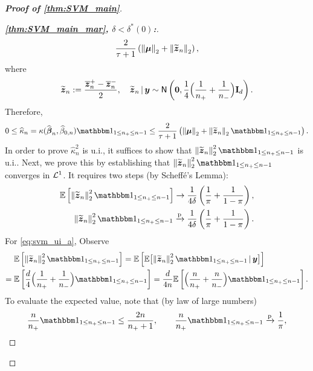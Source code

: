 \begin{proof}[\textbf{Proof of \cref{thm:SVM_main}}]
\begin{proof}[\textbf{\emph{\ref{thm:SVM_main_mar}, $\delta < \delta^*(0)$:}}]
\begin{equation*}
        \frac{2}{\tau + 1} \left( \left\|{{\boldsymbol{\mu}}}\right\|_2 + \left\|{ \widetilde {\text{\boldmath $z$}}_n }\right\|_2 \right),
\end{equation*}
where
\begin{equation*}
    \widetilde {\text{\boldmath $z$}}_n := \frac{\overline{\text{\boldmath $z$}}^+_n - \overline{\text{\boldmath $z$}}^-_n}{2},
    \quad
    \widetilde {\text{\boldmath $z$}}_n \,|\, \text{\boldmath $y$} \sim {\sf N}\left( \mathrm{\bf 0}, \frac14\Bigl( \frac{1}{n_+} + \frac{1}{n_-} \Bigr) \mathrm{\bf I}_d \right).
\end{equation*}
Therefore,
\begin{equation*}
    0   \le   \hat\kappa_n  =  \kappa(\hat\vbeta_n, \hat\beta_{0,n}) \ind_{1 \le n_+ \le n-1} 
    \le \frac{2}{\tau + 1} \left( 
        \norm{\vmu}_2 + \norm{ \wt \zz_n }_2 \ind_{1 \le n_+ \le n-1}
     \right).
\end{equation*}
In order to prove $\hat\kappa_n^2$ is u.i., it suffices to show that $\norm{ \wt \zz_n }_2^2 \ind_{1 \le n_+ \le n-1}$ is u.i.. Next, we prove this by establishing that $\norm{ \wt \zz_n }_2^2 \ind_{1 \le n_+ \le n-1}$ converges in $\mathcal{L}^1$. It requires two steps (by Scheffé's Lemma):
\begin{subequations}
\begin{align}
    \E \left[ \norm{ \wt \zz_n }_2^2 \ind_{1 \le n_+ \le n-1} \right] \to \frac{1}{4\delta} \left( \frac{1}{\pi} + \frac{1}{1-\pi} \right),
    \label{eq:svm_ui_a}
    \\
    \norm{ \wt \zz_n }_2^2 \ind_{1 \le n_+ \le n-1} \conp \frac{1}{4\delta} \left( \frac{1}{\pi} + \frac{1}{1-\pi} \right).
    \label{eq:svm_ui_b}
\end{align}
\end{subequations}
For \cref{eq:svm_ui_a}, Observe
\begin{equation*}
    \begin{aligned}
      & \E \left[ \norm{ \wt \zz_n }_2^2 \ind_{1 \le n_+ \le n-1} \right]
    = \E \left[ \E\bigl[ \norm{ \wt \zz_n }_2^2 \ind_{1 \le n_+ \le n-1} \,|\, \yy \bigr] \right] \\
    = {} & \E \left[ \frac{d}{4} \Bigl( \frac{1}{n_+} + \frac{1}{n_-} \Bigr) \ind_{1 \le n_+ \le n-1} \right]
    = \frac{d}{4n} \E \left[ \Bigl( \frac{n}{n_+} + \frac{n}{n_-} \Bigr) \ind_{1 \le n_+ \le n-1} \right].
    \end{aligned}
\end{equation*}
To evaluate the expected value, note that (by law of large numbers)
\begin{equation*}
    \frac{n}{n_+} \ind_{1 \le n_+ \le n-1} \le \frac{2n}{n_+ + 1},
    \qquad
    \frac{n}{n_+}\ind_{1 \le n_+ \le n-1} \conp \frac{1}{\pi},

\end{equation*}
\end{proof}
\end{proof}
